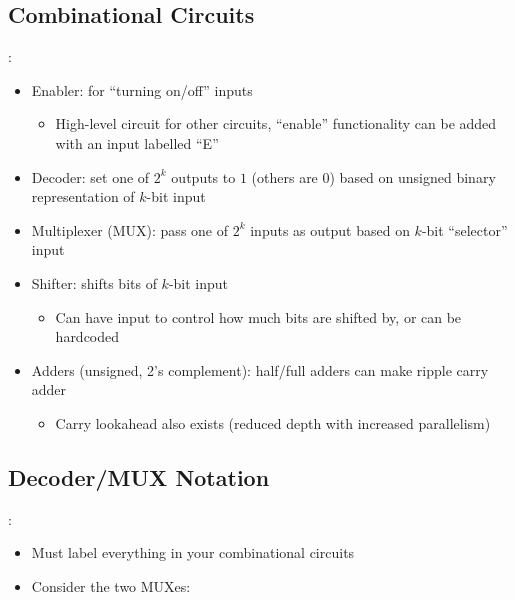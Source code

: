 \documentclass{../slides}
\begin{document}
\subsection{Combinational Circuits}
\begin{frame}{\secname: \subsecname}
    \begin{itemize}
        \item Enabler: for \enquote{turning on/off} inputs
        \begin{itemize}
            \item High-level circuit for other circuits, \enquote{enable} functionality can be added with an input labelled \enquote{E}
        \end{itemize}
        \item Decoder: set one of $2^k$ outputs to $1$ (others are $0$) based on unsigned binary representation of $k$-bit input
        \item Multiplexer (MUX): pass one of $2^k$ inputs as output based on $k$-bit \enquote{selector} input
        \item Shifter: shifts bits of $k$-bit input
        \begin{itemize}
            \item Can have input to control how much bits are shifted by, or can be hardcoded
        \end{itemize}
        \item Adders (unsigned, 2's complement): half/full adders can make ripple carry adder
        \begin{itemize}
            \item Carry lookahead also exists (reduced depth with increased parallelism)
        \end{itemize}
    \end{itemize}
\end{frame}

\subsection{Decoder/MUX Notation}
\begin{frame}{\secname: \subsecname}
    \begin{itemize}
        \item Must label everything in your combinational circuits
        \item Consider the two MUXes:
    \end{itemize}
    \begin{figure}[H]
        \centering
    \end{figure}
\end{frame}
\end{document}

